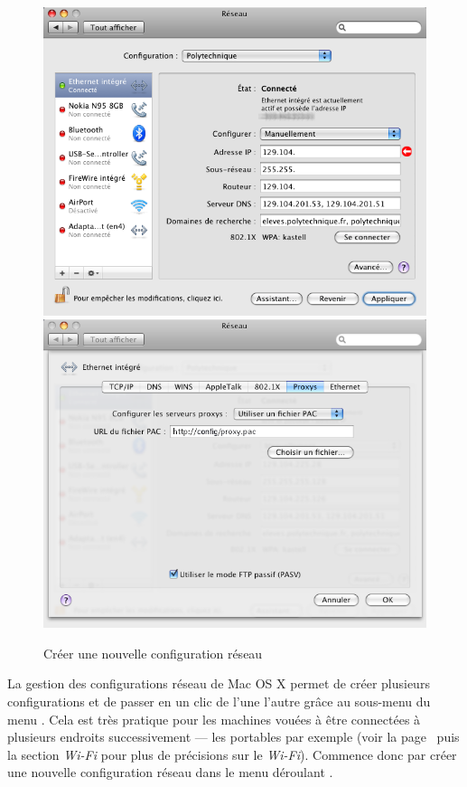\begin{figure}[h]
\begin{center}
{\begin{minipage}{0.43 \textwidth}
\begin{flushright}
        {\includegraphics[width=0.96 \textwidth]{images/mac_config_ip_leopard}} \\
        {\includegraphics[width=0.96 \textwidth]{images/mac_config_proxy_leopard}}
        \end{flushright}
        \end{minipage}
            \label{config:mac:ip:leopard}   }
        \caption{Cr\'eer une nouvelle configuration r\'eseau}

    \end{center}
  \end{figure}

\pagebreak

La gestion des configurations r\'eseau de Mac OS X permet de cr\'eer plusieurs configurations et de passer en un clic de l'une  l'autre gr\^ace au sous-menu  du menu . Cela est tr\`es pratique pour les machines vou\'ees \`a  \^etre connect\'ees \`a  plusieurs endroits successivement --- les portables par exemple (voir la page~\pageref{wifi} puis la section \emph{Wi-Fi} pour plus de pr\'ecisions sur le \emph{Wi-Fi}). Commence donc par cr\'eer une nouvelle configuration r\'eseau dans le menu d\'eroulant .



